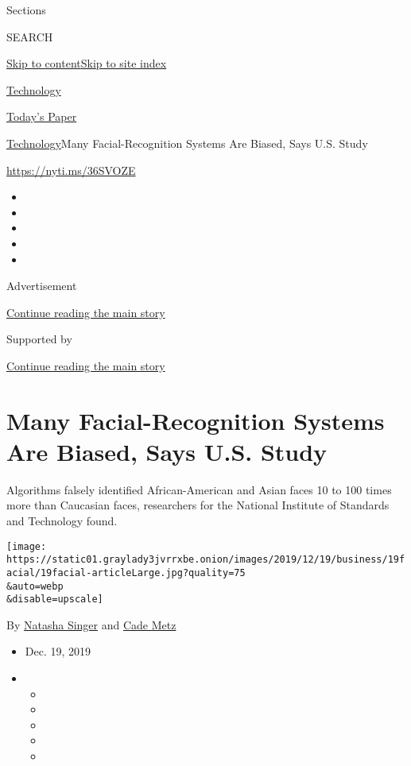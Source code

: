 Sections

SEARCH

\protect\hyperlink{site-content}{Skip to
content}\protect\hyperlink{site-index}{Skip to site index}

\href{https://www.nytimes3xbfgragh.onion/section/technology}{Technology}

\href{https://myaccount.nytimes3xbfgragh.onion/auth/login?response_type=cookie\&client_id=vi}{}

\href{https://www.nytimes3xbfgragh.onion/section/todayspaper}{Today's
Paper}

\href{/section/technology}{Technology}\textbar{}Many Facial-Recognition
Systems Are Biased, Says U.S. Study

\url{https://nyti.ms/36SVOZE}

\begin{itemize}
\item
\item
\item
\item
\item
\end{itemize}

Advertisement

\protect\hyperlink{after-top}{Continue reading the main story}

Supported by

\protect\hyperlink{after-sponsor}{Continue reading the main story}

\hypertarget{many-facial-recognition-systems-are-biased-says-us-study}{%
\section{Many Facial-Recognition Systems Are Biased, Says U.S.
Study}\label{many-facial-recognition-systems-are-biased-says-us-study}}

Algorithms falsely identified African-American and Asian faces 10 to 100
times more than Caucasian faces, researchers for the National Institute
of Standards and Technology found.

\texttt{[image: https://static01.graylady3jvrrxbe.onion/images/2019/12/19/business/19facial/19facial-articleLarge.jpg?quality=75\\\&auto=webp\\\&disable=upscale]}

By \href{https://www.nytimes3xbfgragh.onion/by/natasha-singer}{Natasha
Singer} and \href{https://www.nytimes3xbfgragh.onion/by/cade-metz}{Cade
Metz}

\begin{itemize}
\item
  Dec. 19, 2019
\item
  \begin{itemize}
  \item
  \item
  \item
  \item
  \item
  \end{itemize}
\end{itemize}

